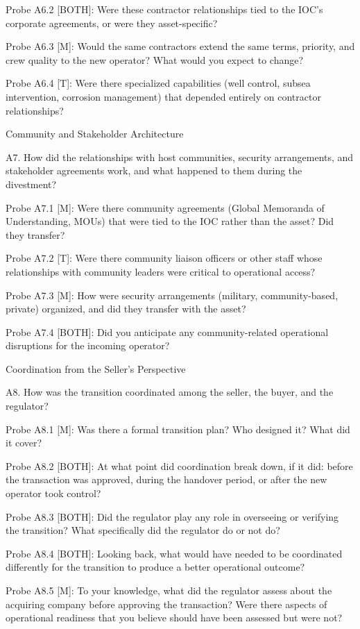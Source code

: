 Probe A6.2 {[}BOTH{]}: Were these contractor relationships tied to the
IOC's corporate agreements, or were they asset-specific?

Probe A6.3 {[}M{]}: Would the same contractors extend the same terms,
priority, and crew quality to the new operator? What would you expect to
change?

Probe A6.4 {[}T{]}: Were there specialized capabilities (well control,
subsea intervention, corrosion management) that depended entirely on
contractor relationships?

Community and Stakeholder Architecture

A7. How did the relationships with host communities, security
arrangements, and stakeholder agreements work, and what happened to them
during the divestment?

Probe A7.1 {[}M{]}: Were there community agreements (Global Memoranda of
Understanding, MOUs) that were tied to the IOC rather than the asset?
Did they transfer?

Probe A7.2 {[}T{]}: Were there community liaison officers or other staff
whose relationships with community leaders were critical to operational
access?

Probe A7.3 {[}M{]}: How were security arrangements (military,
community-based, private) organized, and did they transfer with the
asset?

Probe A7.4 {[}BOTH{]}: Did you anticipate any community-related
operational disruptions for the incoming operator?

Coordination from the Seller's Perspective

A8. How was the transition coordinated among the seller, the buyer, and
the regulator?

Probe A8.1 {[}M{]}: Was there a formal transition plan? Who designed it?
What did it cover?

Probe A8.2 {[}BOTH{]}: At what point did coordination break down, if it
did: before the transaction was approved, during the handover period, or
after the new operator took control?

Probe A8.3 {[}BOTH{]}: Did the regulator play any role in overseeing or
verifying the transition? What specifically did the regulator do or not
do?

Probe A8.4 {[}BOTH{]}: Looking back, what would have needed to be
coordinated differently for the transition to produce a better
operational outcome?

Probe A8.5 {[}M{]}: To your knowledge, what did the regulator assess
about the acquiring company before approving the transaction? Were there
aspects of operational readiness that you believe should have been
assessed but were not?


